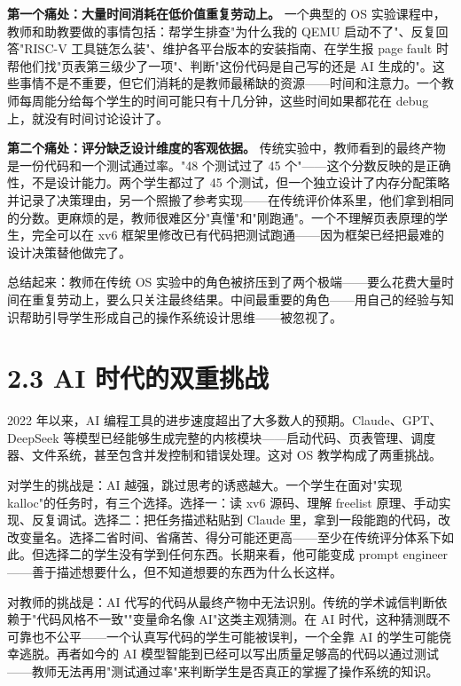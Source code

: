 \documentclass[UTF8,a4paper,12pt,openany]{ctexrep}
\begin{document}
\textbf{第一个痛处：大量时间消耗在低价值重复劳动上。} 一个典型的 OS 实验课程中，教师和助教要做的事情包括：帮学生排查"为什么我的 QEMU 启动不了"、反复回答"RISC-V 工具链怎么装"、维护各平台版本的安装指南、在学生报 page fault 时帮他们找"页表第三级少了一项"、判断"这份代码是自己写的还是 AI 生成的"。这些事情不是不重要，但它们消耗的是教师最稀缺的资源------时间和注意力。一个教师每周能分给每个学生的时间可能只有十几分钟，这些时间如果都花在 debug 上，就没有时间讨论设计了。

\textbf{第二个痛处：评分缺乏设计维度的客观依据。} 传统实验中，教师看到的最终产物是一份代码和一个测试通过率。"48 个测试过了 45 个"------这个分数反映的是正确性，不是设计能力。两个学生都过了 45 个测试，但一个独立设计了内存分配策略并记录了决策理由，另一个照搬了参考实现------在传统评价体系里，他们拿到相同的分数。更麻烦的是，教师很难区分"真懂"和"刚跑通"。一个不理解页表原理的学生，完全可以在 xv6 框架里修改已有代码把测试跑通------因为框架已经把最难的设计决策替他做完了。

总结起来：教师在传统 OS 实验中的角色被挤压到了两个极端------要么花费大量时间在重复劳动上，要么只关注最终结果。中间最重要的角色------用自己的经验与知识帮助引导学生形成自己的操作系统设计思维------被忽视了。

\section{2.3 AI 时代的双重挑战}\label{23-ai-ux65f6ux4ee3ux7684ux53ccux91cdux6311ux6218}

2022 年以来，AI 编程工具的进步速度超出了大多数人的预期。Claude、GPT、DeepSeek 等模型已经能够生成完整的内核模块------启动代码、页表管理、调度器、文件系统，甚至包含并发控制和错误处理。这对 OS 教学构成了两重挑战。

对学生的挑战是：AI 越强，跳过思考的诱惑越大。一个学生在面对"实现 kalloc"的任务时，有三个选择。选择一：读 xv6 源码、理解 freelist 原理、手动实现、反复调试。选择二：把任务描述粘贴到 Claude 里，拿到一段能跑的代码，改改变量名。选择二省时间、省痛苦、得分可能还更高------至少在传统评分体系下如此。但选择二的学生没有学到任何东西。长期来看，他可能变成 prompt engineer------善于描述想要什么，但不知道想要的东西为什么长这样。

对教师的挑战是：AI 代写的代码从最终产物中无法识别。传统的学术诚信判断依赖于"代码风格不一致""变量命名像 AI"这类主观猜测。在 AI 时代，这种猜测既不可靠也不公平------一个认真写代码的学生可能被误判，一个全靠 AI 的学生可能侥幸逃脱。再者如今的 AI 模型智能到已经可以写出质量足够高的代码以通过测试------教师无法再用"测试通过率"来判断学生是否真正的掌握了操作系统的知识。
\end{document}
